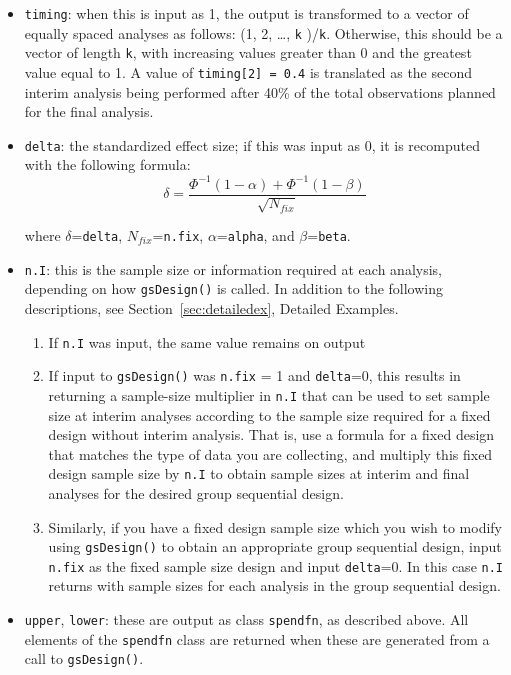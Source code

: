\begin{itemize}
\item \texttt{timing}: when this is input as 1, the output is transformed to
a vector of equally spaced analyses as follows: (1, 2, \ldots, \texttt{k}%
)/\texttt{k}. Otherwise, this should be a vector of length \texttt{k}, with
increasing values greater than 0 and the greatest value equal to 1. A value of
\texttt{timing[2] = 0.4} is translated as the second interim analysis being performed
after 40\% of the total observations planned for the final analysis.

\item \texttt{delta}: the standardized effect size; if this was input as 0,
it is recomputed with the following formula:%
\[
\delta=\frac{\Phi^{-1}(1-\alpha)+\Phi^{-1}(1-\beta)}{\sqrt{N_{fix}}}
\]


where $\delta$=\texttt{delta}, $N_{fix}$=\texttt{n.fix}, $\alpha
$=\texttt{alpha}, and $\beta$=\texttt{beta}.

\item \texttt{n.I}: this is the sample size or information required at each
analysis, depending on how \texttt{gsDesign()} is called. In addition to the
following descriptions, see Section~\ref{sec:detailedex}, Detailed Examples.

\begin{enumerate}
\item If \texttt{n.I} was input, the same value remains on output

\item If input to \texttt{gsDesign()} was \texttt{n.fix} = 1 and
\texttt{delta}=0, this results in returning a sample-size multiplier in
\texttt{n.I} that can be used to set sample size at interim analyses according
to the sample size required for a fixed design without interim analysis. That
is, use a formula for a fixed design that matches the type of data you are
collecting, and multiply this fixed design sample size by \texttt{n.I} to
obtain sample sizes at interim and final analyses for the desired group
sequential design.

\item Similarly, if you have a fixed design sample size which you wish to
modify using \texttt{gsDesign()} to obtain an appropriate group sequential
design, input \texttt{n.fix} as the fixed sample size design and input
\texttt{delta}=0. In this case \texttt{n.I} returns with sample sizes for
each analysis in the group sequential design.
\end{enumerate}

\item \texttt{upper}, \texttt{lower}: these are output as class 
\texttt{spendfn}, as described above. All elements of the 
\texttt{spendfn} class are returned when these are
generated from a call to \texttt{gsDesign()}.
\end{itemize}

